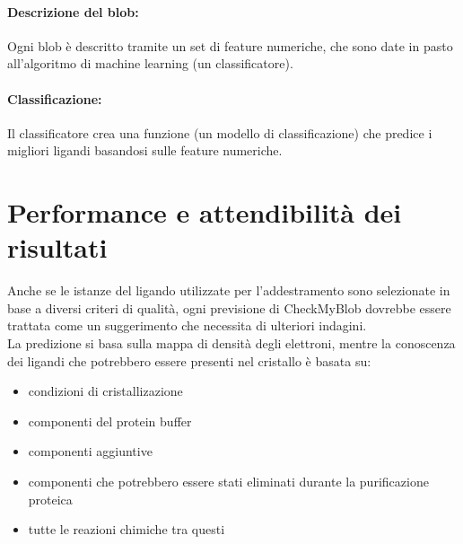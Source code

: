 \documentclass{article}
\begin{document}
\paragraph*{Descrizione del blob:} Ogni blob è descritto tramite un set di feature numeriche, che sono date in pasto all’algoritmo di machine learning (un classificatore). 
\paragraph*{Classificazione:} Il classificatore crea una funzione (un modello di classificazione) che predice i migliori ligandi basandosi sulle feature numeriche.

\section{Performance e attendibilità dei risultati}
Anche se le istanze del ligando utilizzate per l'addestramento sono selezionate in base a diversi criteri di qualità, ogni previsione di CheckMyBlob dovrebbe essere trattata come un suggerimento che necessita di ulteriori indagini.\\
La predizione si basa sulla mappa di densità degli elettroni, mentre la conoscenza dei ligandi che potrebbero essere presenti nel cristallo è basata su:
\begin{itemize}
  \item condizioni di cristallizazione
  \item componenti del protein buffer
  \item componenti aggiuntive
  \item componenti che potrebbero essere stati eliminati durante la purificazione proteica
  \item tutte le reazioni chimiche tra questi
\end{itemize}
\end{document}
